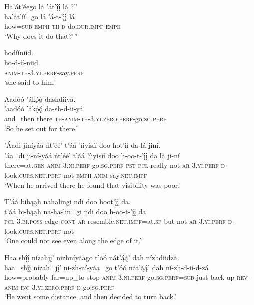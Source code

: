 \ea\label{ex:text5-5-6}
Ha’át’éego lá ’át’į́į́ lá ?''\\
\gll ha’át’íí=go	lá	’á-t-’į́į́	lá\\
     how=\textsc{sub}	\textsc{emph}	\textsc{th}-\textsc{d}-do.\textsc{dur}.\textsc{impf}	\textsc{emph}\\
\glt `Why does it do that?'''
\z

\ea\label{ex:text5-5-7}
hodííniid.\\
\gll ho-d-íí-niid\\
     \textsc{anim}-\textsc{th}-3.\textsc{yi}.\textsc{perf}-say.\textsc{perf}\\
\glt `she said to him.'
\z

\ea\label{ex:text5-6-1}
Aadóó ’ákǫ́ǫ́ dashdiiyá.\\
\gll ’aadóó	’ákǫ́ǫ́	da-sh-d-ii-yá\\
     and\_then	there	\textsc{th}-\textsc{anim}-\textsc{th}-3.\textsc{yi}.\textsc{zero}.\textsc{perf}-go.\textsc{sg}.\textsc{perf}\\
\glt `So he set out for there.'
\z

\ea\label{ex:text5-6-2}
’Áadi jiníyáá ńt’éé’ t’áá ’íiyisíí doo hot’į́į da lá jiní.\\
\gll ’áa=di	ji-ní-yáá	ńt’éé’	t’áá	’íiyisíí	doo	h-oo-t-’į́į	da	lá	ji-ní\\
     there=at.\textsc{gen}	\textsc{anim}-3.\textsc{ni}.\textsc{perf}-go.\textsc{sg}.\textsc{perf}	\textsc{pst}	\textsc{pcl}	really	not	\textsc{ar}-3.\textsc{yi}.\textsc{perf}-\textsc{d}-look.\textsc{curs}.\textsc{neu}.\textsc{perf}	not	\textsc{emph}	\textsc{anim}-say.\textsc{neu}.\textsc{impf}\\
\glt `When he arrived there he found that visibility was poor.'
\z

\newpage
\ea\label{ex:text5-6-3}
T’áá bibąąh nahalingi ndi doo hoot’į́į da.\\
\gll t’áá	bi-bąąh	na-ha-lin=gi	ndi	doo	h-oo-t-’į́į	da\\
     \textsc{pcl}	3.\textsc{bi}.\textsc{poss}-edge	\textsc{cont}-\textsc{ar}-resemble.\textsc{neu}.\textsc{impf}=at.\textsc{sp}	but	not	\textsc{ar}-3.\textsc{yi}.\textsc{perf}-\textsc{d}-look.\textsc{curs}.\textsc{neu}.\textsc{perf}	not\\
\glt `One could not see even along the edge of it.'
\z

\ea\label{ex:text5-6-4}
Haa shį́į́ nízahjį’ nizhníyáago t’óó nát’ą́ą́’ dah nízhdiidzá.\\
\gll haa=shį́į́	nízah=jį’	ni-zh-ní-yáa=go	t’óó	nát’ą́ą́’	dah	ní-zh-d-ii-d-zá\\
     how=probably	far=up\_to	stop-\textsc{anim}-3.\textsc{ni}.\textsc{perf}-go.\textsc{sg}.\textsc{perf}=\textsc{sub}	just	back	up	\textsc{rev}-\textsc{anim}-\textsc{inc}-3.\textsc{yi}.\textsc{zero}.\textsc{perf}-\textsc{d}-go.\textsc{sg}.\textsc{perf}\\
\glt `He went some distance, and then decided to turn back.'
\z

